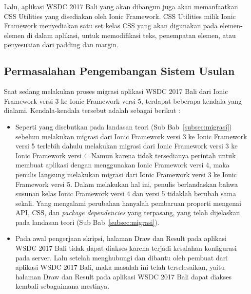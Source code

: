 Lalu, aplikasi WSDC 2017 Bali yang akan dibangun juga akan memanfaatkan CSS Utilities yang disediakan oleh Ionic Framework. CSS Utilities milik Ionic Framework menyediakan satu set kelas CSS yang akan digunakan pada elemen-elemen di dalam aplikasi, untuk memodifikasi teks, penempatan elemen, atau penyesuaian dari padding dan margin.

\subsection{Permasalahan Pengembangan Sistem Usulan}
\label{sec:analisisPermasalahanSistemKini}
Saat sedang melakukan proses migrasi aplikasi WSDC 2017 Bali dari Ionic Framework versi 3 ke Ionic Framework versi 5, terdapat beberapa kendala yang dialami. Kendala-kendala tersebut adalah sebagai berikut : 
\begin{itemize}
	\item Seperti yang disebutkan pada landasan teori (Sub Bab~\ref{subsec:migrasi}) sebelum melakukan migrasi dari Ionic Framework versi 3 ke Ionic Framework versi 5 terlebih dahulu melakukan migrasi dari Ionic Framework versi 3 ke Ionic Framework versi 4. Namun karena tidak tersedianya perintah untuk membuat aplikasi dengan menggunakan Ionic Framework versi 4, maka penulis langsung melakukan migrasi dari Ionic Framework versi 3 ke Ionic Framework versi 5. Dalam melakukan hal ini, penulis berlandaskan bahwa susunan kelas Ionic Framework versi 4 dan versi 5 tidaklah berubah sama sekali. Yang mengalami perubahan hanyalah pembaruan properti mengenai API, CSS, dan {\it package dependencies} yang terpasang, yang telah dijelaskan pada landasan teori (Sub Bab~\ref{subsec:migrasi}).
	\item Pada awal pengerjaan skripsi, halaman Draw dan Result pada aplikasi WSDC 2017 Bali tidak dapat diakses karena terjadi kesalahan konfigurasi pada server. Lalu setelah menghubungi dan dibantu oleh pembuat dari aplikasi WSDC 2017 Bali, maka masalah ini telah terselesaikan, yaitu halaman Draw dan Result pada aplikasi WSDC 2017 Bali dapat diakses kembali sebagaimana mestinya.
\end{itemize}
